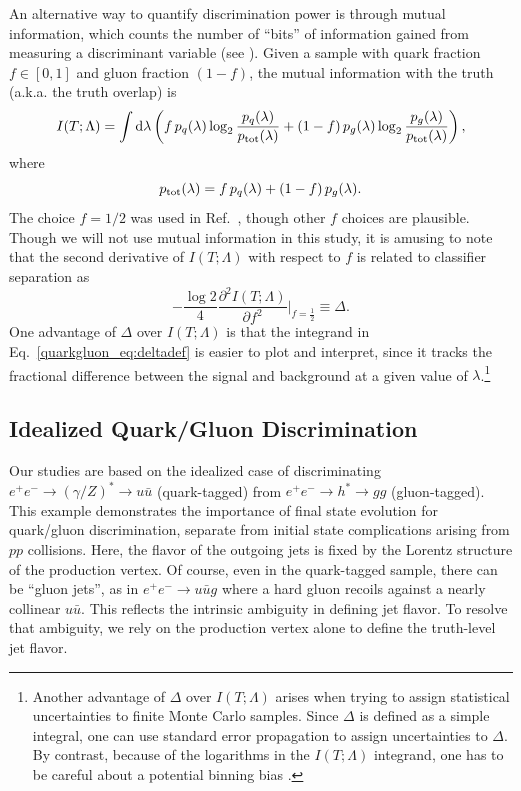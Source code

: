 \documentclass[11pt]{cernrep}
\begin{document}
An alternative way to quantify discrimination power is through mutual information, which counts the number of ``bits'' of information gained from measuring a discriminant variable (see \cite{Larkoski:2014pca}).  Given a sample with quark fraction $f \in [0,1]$ and gluon fraction $(1-f)$, the mutual information with the truth (a.k.a. the truth overlap) is
\begin{equation}
I(T; \Lambda) = \int \text{d} \lambda \left(f \, p_q(\lambda) \log_2 \frac{p_q(\lambda)}{p_{\rm tot}(\lambda)} + (1-f) \, p_g(\lambda) \log_2 \frac{p_g(\lambda)}{p_{\rm tot}(\lambda)}   \right),
\end{equation}
where
\begin{equation}
p_{\rm tot}(\lambda) = f \, p_q(\lambda) + (1-f) \, p_g(\lambda).
\end{equation}
The choice $f = 1/2$ was used in Ref.~\cite{Larkoski:2014pca}, though other $f$ choices are plausible.  Though we will not use mutual information in this study, it is amusing to note that the second derivative of $I(T;\Lambda)$ with respect to $f$ is related to classifier separation as
\begin{equation}
\label{quarkgluon_eq:altdeltadef}
- \frac{\log 2}{4} \frac{\partial^2 I(T;\Lambda)}{\partial f^2} \Big|_{f = \frac{1}{2}} \equiv \Delta.
\end{equation}
One advantage of $\Delta$ over $I(T;\Lambda)$ is that the integrand in Eq.~\eqref{quarkgluon_eq:deltadef} is easier to plot and interpret, since it tracks the fractional difference between the signal and background at a given value of $\lambda$.\footnote{Another advantage of $\Delta$ over $I(T; \Lambda)$ arises when trying to assign statistical uncertainties to finite Monte Carlo samples.  Since $\Delta$ is defined as a simple integral, one can use standard error propagation to assign uncertainties to $\Delta$.  By contrast, because of the logarithms in the $I(T; \Lambda)$ integrand, one has to be careful about a potential binning bias \cite{Larkoski:2014pca}.}

\subsection{Idealized Quark/Gluon Discrimination}
\label{quarkgluon_sec:ee}

Our studies are based on the idealized case of discriminating $e^+ e^- \to (\gamma/Z)^* \to u \bar{u}$ (quark-tagged) from $e^+ e^- \to h^* \to gg$ (gluon-tagged).  This example demonstrates the importance of final state evolution for quark/gluon discrimination, separate from initial state complications arising from $pp$ collisions.  Here, the flavor of the outgoing jets is fixed by the Lorentz structure of the production vertex.  Of course, even in the quark-tagged sample, there can be ``gluon jets'', as in $e^+ e^- \to u \bar{u} g$ where a hard gluon recoils against a nearly collinear $u \bar{u}$.  This reflects the intrinsic ambiguity in defining jet flavor.   To resolve that ambiguity, we rely on the production vertex alone to define the truth-level jet flavor.
\end{document}
